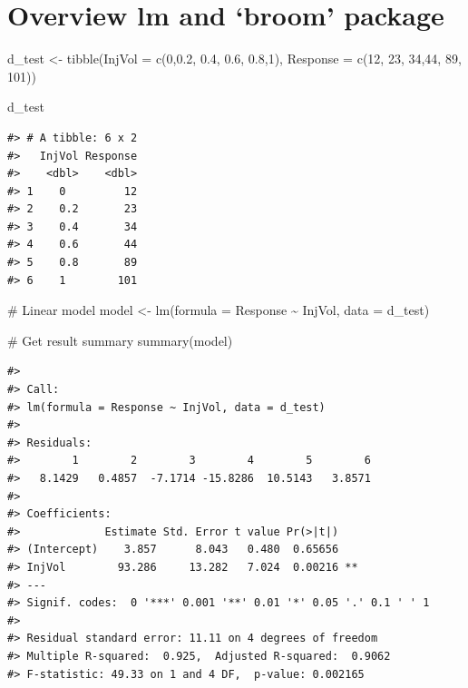 \documentclass[
  letterpaper,
  DIV=11,
  numbers=noendperiod]{scrreprt}
\newenvironment{Shaded}{\begin{snugshade}}{\end{snugshade}}
\newcommand{\AttributeTok}[1]{\textcolor[rgb]{0.40,0.45,0.13}{#1}}
\newcommand{\CommentTok}[1]{\textcolor[rgb]{0.37,0.37,0.37}{#1}}
\newcommand{\DecValTok}[1]{\textcolor[rgb]{0.68,0.00,0.00}{#1}}
\newcommand{\FloatTok}[1]{\textcolor[rgb]{0.68,0.00,0.00}{#1}}
\newcommand{\FunctionTok}[1]{\textcolor[rgb]{0.28,0.35,0.67}{#1}}
\newcommand{\NormalTok}[1]{\textcolor[rgb]{0.00,0.23,0.31}{#1}}
\newcommand{\OtherTok}[1]{\textcolor[rgb]{0.00,0.23,0.31}{#1}}
\newcommand{\SpecialCharTok}[1]{\textcolor[rgb]{0.37,0.37,0.37}{#1}}
\begin{document}
\hypertarget{overview-lm-and-broom-package}{%
\section{Overview lm and `broom'
package}\label{overview-lm-and-broom-package}}

\begin{Shaded}
\begin{Highlighting}[]
\NormalTok{d\_test }\OtherTok{\textless{}{-}} \FunctionTok{tibble}\NormalTok{(}\AttributeTok{InjVol =} \FunctionTok{c}\NormalTok{(}\DecValTok{0}\NormalTok{,}\FloatTok{0.2}\NormalTok{, }\FloatTok{0.4}\NormalTok{, }\FloatTok{0.6}\NormalTok{, }\FloatTok{0.8}\NormalTok{,}\DecValTok{1}\NormalTok{),}
                  \AttributeTok{Response  =} \FunctionTok{c}\NormalTok{(}\DecValTok{12}\NormalTok{, }\DecValTok{23}\NormalTok{, }\DecValTok{34}\NormalTok{,}\DecValTok{44}\NormalTok{, }\DecValTok{89}\NormalTok{, }\DecValTok{101}\NormalTok{)) }
                 
\NormalTok{d\_test}
\end{Highlighting}
\end{Shaded}

\begin{verbatim}
#> # A tibble: 6 x 2
#>   InjVol Response
#>    <dbl>    <dbl>
#> 1    0         12
#> 2    0.2       23
#> 3    0.4       34
#> 4    0.6       44
#> 5    0.8       89
#> 6    1        101
\end{verbatim}

\begin{Shaded}
\begin{Highlighting}[]
\CommentTok{\# Linear model}
\NormalTok{model }\OtherTok{\textless{}{-}} \FunctionTok{lm}\NormalTok{(}\AttributeTok{formula =}\NormalTok{ Response }\SpecialCharTok{\textasciitilde{}}\NormalTok{ InjVol, }\AttributeTok{data =}\NormalTok{ d\_test)}

\CommentTok{\# Get result summary}
\FunctionTok{summary}\NormalTok{(model)}
\end{Highlighting}
\end{Shaded}

\begin{verbatim}
#> 
#> Call:
#> lm(formula = Response ~ InjVol, data = d_test)
#> 
#> Residuals:
#>        1        2        3        4        5        6 
#>   8.1429   0.4857  -7.1714 -15.8286  10.5143   3.8571 
#> 
#> Coefficients:
#>             Estimate Std. Error t value Pr(>|t|)   
#> (Intercept)    3.857      8.043   0.480  0.65656   
#> InjVol        93.286     13.282   7.024  0.00216 **
#> ---
#> Signif. codes:  0 '***' 0.001 '**' 0.01 '*' 0.05 '.' 0.1 ' ' 1
#> 
#> Residual standard error: 11.11 on 4 degrees of freedom
#> Multiple R-squared:  0.925,  Adjusted R-squared:  0.9062 
#> F-statistic: 49.33 on 1 and 4 DF,  p-value: 0.002165
\end{verbatim}
\end{document}
